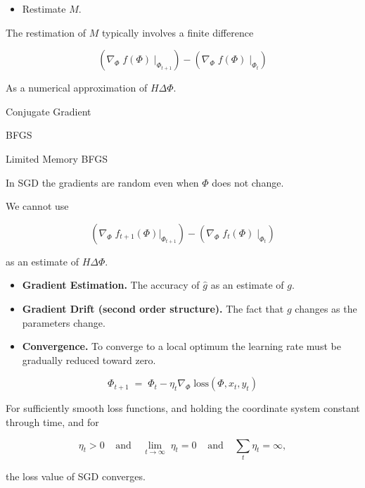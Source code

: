 {{\begin{itemize}
\vfill
\item Restimate $M$.
\end{itemize}

\vfill
The restimation of $M$ typically involves a finite difference

\vfill
$$\left(\nabla_\Phi \;f(\Phi)\;|_{\Phi_{t+1}}\right) - \left(\nabla_\Phi \;f(\Phi)\;|_{\Phi_t}\right)$$

\vfill
As a numerical approximation of $H \Delta \Phi$.


Conjugate Gradient

\vfill
BFGS

\vfill
Limited Memory BFGS


In SGD the gradients are random even when $\Phi$ does not change.

\vfill
We cannot use

\vfill
$$\left(\nabla_\Phi \;f_{t+1}(\Phi)|_{\Phi_{t+1}}\right) - \left(\nabla_\Phi \;f_t(\Phi)\;|_{\Phi_t}\right)$$

\vfill
as an estimate of $H \Delta \Phi$.


\vfill
\begin{itemize}
\item {\bf Gradient Estimation.} The accuracy of $\hat{g}$ as an estimate of $g$.

  \vfill
\item {\bf Gradient Drift (second order structure).} The fact that $g$ changes as the parameters change.

  \vfill
\item {\bf Convergence.} To converge to a local optimum the learning rate must be gradually reduced toward zero.
\end{itemize}


$$\Phi_{t+1} \;=\; \Phi_t - \eta_t \nabla_\Phi\;\mathrm{loss}(\Phi,x_t,y_t)$$

\vfill
For sufficiently smooth loss functions, {\color{red} and holding the coordinate system constant through time}, and for

$$\eta_t > 0\;\;\;\;\mbox{and}\;\;\;\;\lim_{t \rightarrow \infty} \;\eta_t = 0\;\;\;\;\mbox{and}\;\;\;\;\sum_t \eta_t = \infty,$$

\vfill
the loss value of SGD converges.

}}
